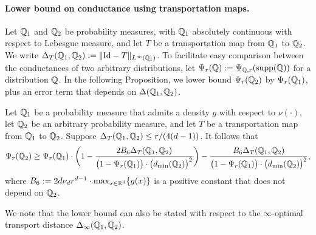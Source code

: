 \paragraph{Lower bound on conductance using transportation maps.}
Let $\mathbb{Q}_1$ and $\mathbb{Q}_2$ be probability measures, with $\mathbb{Q}_1$ absolutely continuous with respect to Lebesgue measure, and let $T$ be a transportation map from $\mathbb{Q}_1$ to $\mathbb{Q}_2$. We write $\Delta_T(\mathbb{Q}_1,\mathbb{Q}_2) := \|\mathrm{Id} - T\|_{L^{\infty}(\mathbb{Q}_1)}$. To facilitate easy comparison between the conductances of two arbitrary distributions, let $\Psi_r(\mathbb{Q}) := \Psi_{\mathbb{Q},r}(\mathrm{supp}(\mathbb{Q}))$ for a distribution $\mathbb{Q}$. In the following Proposition, we lower bound $\Psi_r(\mathbb{Q}_2)$ by $\Psi_r(\mathbb{Q}_1)$, plus an error term that depends on $\Delta(\mathbb{Q}_1,\mathbb{Q}_2)$.
\begin{proposition}
	\label{prop:conductance_lb_transportation_distance}
	Let $\mathbb{Q}_1$ be a probability measure that admits a density $g$ with respect to $\nu(\cdot)$, let $\mathbb{Q}_2$ be an arbitrary probability measure, and let $T$ be a transportation map from $\mathbb{Q}_1$ to $\mathbb{Q}_2$. Suppose $\Delta_T(\mathbb{Q}_1,\mathbb{Q}_2) \leq r/(4(d - 1))$. It follows that
	\begin{equation}
	\label{eqn:conductance_lb_transportation_distance}
	\Psi_r(\mathbb{Q}_2) \geq \Psi_r(\mathbb{Q}_1) \cdot \biggl(1 - \frac{2B_6\Delta_T(\mathbb{Q}_1,\mathbb{Q}_2)}{\bigl(1 - \Psi_r(\mathbb{Q}_1)\bigr) \cdot \bigl(d_{\min}(\mathbb{Q}_2)\bigr)^2}\biggr) - \frac{B_6 \Delta_T(\mathbb{Q}_1,\mathbb{Q}_2)}{\bigl(1 - \Psi_r(\mathbb{Q}_1)\bigr) \cdot \bigl(d_{\min}(\mathbb{Q}_2)\bigr)^2},
	\end{equation}
	where $B_6 := 2d \nu_d r^{d - 1} \cdot \max_{x \in \mathbb{R}^d}\{g(x)\}$ is a positive constant that does not depend on $\mathbb{Q}_2$. 
\end{proposition}
We note that the lower bound can also be stated with respect to the $\infty$-optimal transport distance $\Delta_{\infty}(\mathbb{Q}_1,\mathbb{Q}_2)$. 
